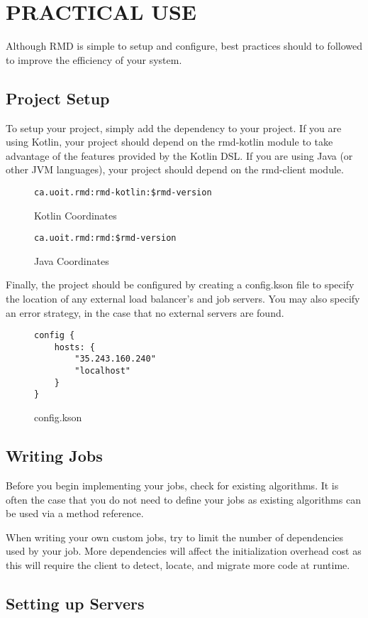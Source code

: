 \section{PRACTICAL USE}\label{sec:practicalUse}

Although RMD is simple to setup and configure,
best practices should to followed to improve the
efficiency of your system.


\subsection{Project Setup}\label{subsec:projectSetup}

To setup your project, simply add the dependency to your
project.
If you are using Kotlin, your project should depend
on the rmd-kotlin module to take advantage of
the features provided by the Kotlin DSL.
If you are using Java (or other JVM languages), your project
should depend on the rmd-client module.

\begin{figure}[H]
\caption{Kotlin Coordinates}
    \begin{lstlisting}
ca.uoit.rmd:rmd-kotlin:$rmd-version
    \end{lstlisting}
\end{figure}

\begin{figure}[H]
    \caption{Java Coordinates}
    \begin{lstlisting}
ca.uoit.rmd:rmd:$rmd-version
    \end{lstlisting}
\end{figure}

Finally, the project should be configured by creating
a config.kson file to specify the location of any
external load balancer's and job servers. You may also specify
an error strategy, in the case that no external servers are found.

\begin{figure}[H]
\caption{config.kson}
    \begin{lstlisting}
config {
    hosts: {
        "35.243.160.240"
        "localhost"
    }
}
    \end{lstlisting}
\end{figure}

\subsection{Writing Jobs}\label{subsec:writingJobs}
Before you begin implementing your jobs, check for
existing algorithms.
It is often the case that you do not need to define
your jobs as existing algorithms can be used via a method reference.

When writing your own custom jobs, try to limit the number of
dependencies used by your job.
More dependencies will affect the initialization overhead cost
as this will require the client to detect, locate, and migrate
more code at runtime.


\subsection{Setting up Servers}\label{subsec:settingUpServers}

